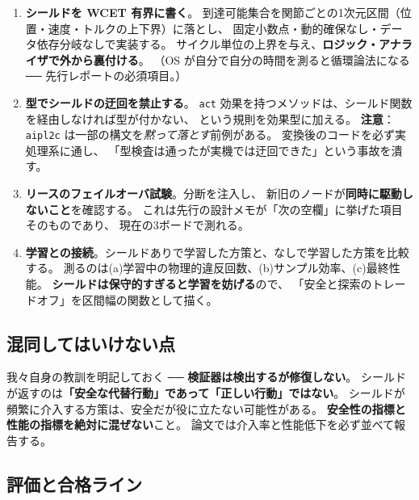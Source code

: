 \documentclass[11pt,a4paper]{article}
\newcommand{\code}[1]{\texttt{#1}}
\newcommand{\prob}[1]{\textbf{\textcolor{red!55!black}{#1}}}
\newcommand{\keyp}[1]{\textbf{\textcolor{blue!45!black}{#1}}}
\begin{document}
\begin{enumerate}[leftmargin=1.8em,itemsep=4pt]
  \item \keyp{シールドを WCET 有界に書く}。
        到達可能集合を関節ごとの1次元区間（位置・速度・トルクの上下界）に落とし、
        固定小数点・動的確保なし・データ依存分岐なしで実装する。
        サイクル単位の上界を与え、\keyp{ロジック・アナライザで外から裏付ける}。
        （OS が自分で自分の時間を測ると循環論法になる ── 先行レポートの必須項目。）
  \item \keyp{型でシールドの迂回を禁止する}。
        \code{act} 効果を持つメソッドは、シールド関数を経由しなければ型が付かない、
        という規則を効果型に加える。
        \prob{注意}：\code{aipl2c} は一部の構文を\emph{黙って落とす}前例がある。
        変換後のコードを必ず実処理系に通し、
        「型検査は通ったが実機では迂回できた」という事故を潰す。
  \item \keyp{リースのフェイルオーバ試験}。分断を注入し、
        新旧のノードが\prob{同時に駆動しないこと}を確認する。
        これは先行の設計メモが「次の空欄」に挙げた項目そのものであり、
        現在の3ボードで測れる。
  \item \keyp{学習との接続}。シールドありで学習した方策と、なしで学習した方策を比較する。
        測るのは(a)学習中の物理的違反回数、(b)サンプル効率、(c)最終性能。
        \prob{シールドは保守的すぎると学習を妨げる}ので、
        「安全と探索のトレードオフ」を区間幅の関数として描く。
\end{enumerate}

\subsection{混同してはいけない点}

我々自身の教訓を明記しておく ── \keyp{検証器は検出するが修復しない}。
シールドが返すのは\keyp{「安全な代替行動」であって「正しい行動」ではない}。
シールドが頻繁に介入する方策は、安全だが役に立たない可能性がある。
\prob{安全性の指標と性能の指標を絶対に混ぜない}こと。
論文では介入率と性能低下を必ず並べて報告する。

\subsection{評価と合格ライン}
\end{document}
